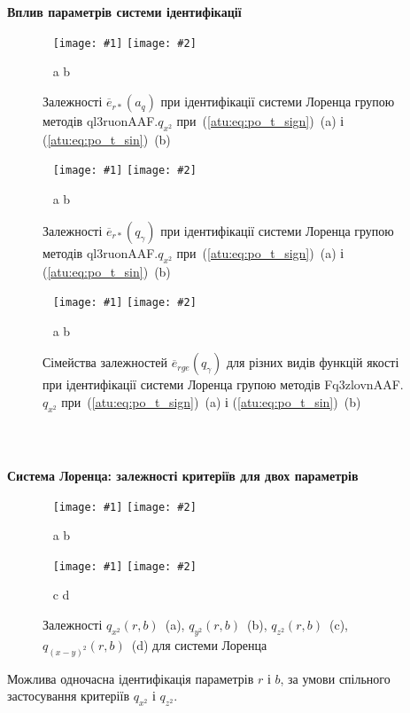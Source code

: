 \documentclass[14pt,handout,utf8]{beamer}
\newcommand{\Xhead}[1]{
 \begin{center}%
      \textbf{#1}%
 \end{center}%
}
\newcommand{\ABlbl}{%
  \vspace{-2.7ex}
  \begin{center}
    ~ \hfill a \hfill\hfill b \hfill ~
  \end{center}
  \vspace{-2.0ex}
}
\newcommand{\PicDouble}[2]{%
 \begin{center}
    ~ \hfill
    \texttt{[image: \#1]}
    \hfill
    \texttt{[image: \#2]}
    \hfill ~
  \end{center}
  \ABlbl
}
\newcommand{\PicDoubleS}[2]{%
 \begin{center}
    ~ \hfill
    \texttt{[image: \#1]}
    \hfill
    \texttt{[image: \#2]}
    \hfill ~
  \end{center}
  \ABlbl
}
\newcommand{\PicDoubleNL}[2]{%
 \begin{center}
    ~ \hfill
    \texttt{[image: \#1]}
    \hfill
    \texttt{[image: \#2]}
    \hfill ~
  \end{center}
}
\begin{document}
\begin{frame}
  \frametitle{~}

  \Xhead{Вплив параметрів системи ідентифікації}

  \begin{figure}[htb!]
    \PicDoubleS{../p5/p/cha/lor/ql3ruonAAF/lor_ql3ruonAAF_qx2-p_a_q_e_sign.png}{../p5/p/cha/lor/ql3ruonAAF/lor_ql3ruonAAF_qx2-p_a_q_e_sin.png}
    \caption{Залежності $\overline{e}_{r *}(a_q)$ при ідентифікації системи Лоренца групою методів ql3ruonAAF.$q_{x^2} $ при~(\ref{atu:eq:po_t_sign})~(a) і (\ref{atu:eq:po_t_sin})~(b)}
    \label{atu:f:lor_a_q_ql3ruonAAF.q_x2}
  \end{figure}

  \begin{figure}[htb!]
    \PicDoubleS{../p5/p/cha/lor/ql3ruonAAF/lor_ql3ruonAAF_qx2-p_qgamma_e_sign.png}{../p5/p/cha/lor/ql3ruonAAF/lor_ql3ruonAAF_qx2-p_qgamma_e_sin.png}
    \caption{Залежності $\overline{e}_{r *}(q_\gamma)$ при ідентифікації системи Лоренца групою методів ql3ruonAAF.$q_{x^2} $ при~(\ref{atu:eq:po_t_sign})~(a) і (\ref{atu:eq:po_t_sin})~(b)}
    \label{atu:f:lor_qg_ql3ruonAAF.q_x2}
  \end{figure}

  \begin{figure}[htb!]
    \PicDoubleS{../p5/p/cha/lor/Fq3zlovnAAF/f_type/lor_Fq3zlovnAAF_qx2_Ft-p_qg_e_all_sign_rge.png}{../p5/p/cha/lor/Fq3zlovnAAF/f_type/lor_Fq3zlovnAAF_qx2_Ft-p_qg_e_all_sin_rge.png}
    \caption{Сімейства залежностей $\overline{e}_{rge}(q_\gamma)$ для різних видів функцій якості при ідентифікації системи Лоренца групою методів Fq3zlovnAAF.$q_{x^2}$ при~(\ref{atu:eq:po_t_sign})~(a) і (\ref{atu:eq:po_t_sin})~(b)}
    \label{atu:f:lor_ftype_rge}
  \end{figure}

\end{frame}




\begin{frame}
  \frametitle{~}


  \Xhead{Система Лоренца: залежності критеріїв для двох параметрів}

\begin{figure}[htb!]
  \PicDouble{../p5/p/cha/lor/q2d/lor_qx2_r_b.png}{../p5/p/cha/lor/q2d/lor_qy2_r_b.png}
  \PicDoubleNL{../p5/p/cha/lor/q2d/lor_qz2_r_b.png}{../p5/p/cha/lor/q2d/lor_qxmy2_r_b.png}
  \vspace{-2.7ex}
  \begin{center}
    ~ \hfill c \hfill\hfill d \hfill ~
  \end{center}
  \vspace{-1.5ex}
  \caption{Залежності $q_{x^2}(r,b)$~(a), $q_{y^2}(r,b)$~(b), $q_{z^2}(r,b)$~(c), $q_{(x-y)^2}(r,b)$~(d) для системи Лоренца}
  \label{atu:f:lor_q_r_b}
\end{figure}

  Можлива одночасна ідентифікація параметрів
  $r$ і
  $b$, за умови спільного застосування критеріїв
  $q_{x^2}$ і
  $q_{z^2}$.

\end{frame}
\end{document}
